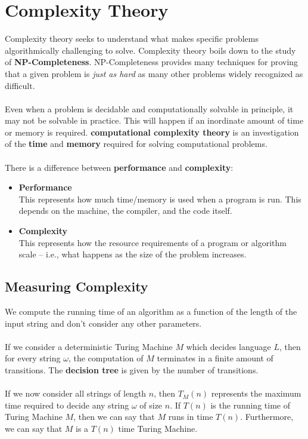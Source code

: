 \documentclass{article}
\begin{document}
\section{Complexity Theory}
Complexity theory seeks to understand what makes specific problems algorithmically challenging to solve. Complexity theory boils down to the study of \textbf{NP-Completeness}. NP-Completeness provides many techniques for proving that a given problem is \textit{just as hard} as many other problems widely recognized as difficult. \\ \\
Even when a problem is decidable and computationally solvable in principle, it may not be solvable in practice. This will happen if an inordinate amount of time or memory is required. \textbf{computational complexity theory} is an investigation of the \textbf{time} and \textbf{memory} required for solving computational problems. \\ \\
There is a difference between \textbf{performance} and \textbf{complexity}:
\begin{itemize}
	\item \textbf{Performance} \\
	This represents how much time/memory is used when a program is run. This depends on the machine, the compiler, and the code itself.
	
	\item \textbf{Complexity} \\
	This represents how the resource requirements of a program or algorithm scale -- i.e., what happens as the size of the problem increases.
\end{itemize}

\subsection{Measuring Complexity}
We compute the running time of an algorithm as a function of the length of the input string and don't consider any other parameters. \\ \\
If we consider a deterministic Turing Machine $M$ which decides language $L$, then for every string $\omega$, the computation of $M$ terminates in a finite amount of transitions. The \textbf{decision tree} is given by the number of transitions. \\ \\
If we now consider all strings of length $n$, then $T_M(n)$ represents the maximum time required to decide any string $\omega$ of size $n$. If $T(n)$ is the running time of Turing Machine $M$, then we can say that $M$ runs in time $T(n)$. Furthermore, we can say that $M$ is a $T(n)$ time Turing Machine.
\end{document}
